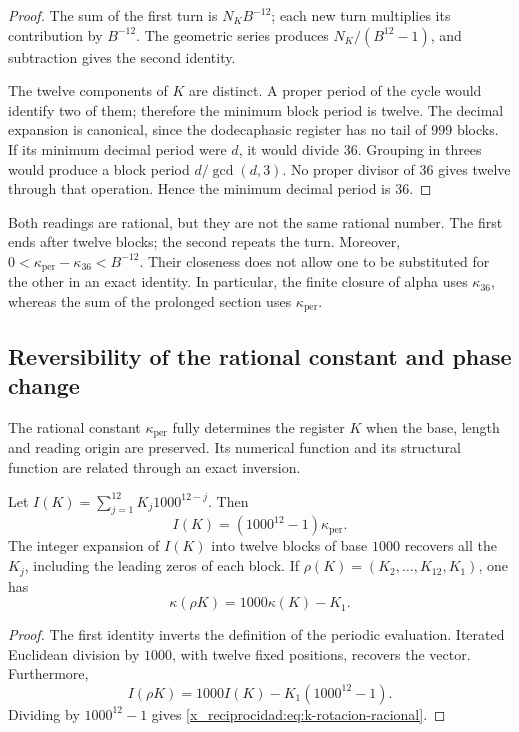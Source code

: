 \begin{proof}
The sum of the first turn is \(N_KB^{-12}\); each new turn
multiplies its contribution by \(B^{-12}\). The geometric series produces
\(N_K/(B^{12}-1)\), and subtraction gives the second identity.

The twelve components of \(K\) are distinct. A proper period of the cycle
would identify two of them; therefore the minimum block period is
twelve. The decimal expansion is canonical, since the dodecaphasic register has no tail
of 999 blocks. If its minimum decimal period were \(d\), it would divide
36. Grouping in threes would produce a block period
\(d/\gcd(d,3)\). No proper divisor of 36 gives twelve through that
operation. Hence the minimum decimal period is 36.
\end{proof}

Both readings are rational, but they are not the same rational number. The first
ends after twelve blocks; the second repeats the turn. Moreover,
\(0<\kappa_{\mathrm{per}}-\kappa_{36}<B^{-12}\). Their closeness does not
allow one to be substituted for the other in an exact identity. In particular,
the finite closure of alpha uses \(\kappa_{36}\), whereas the
sum of the prolonged section uses \(\kappa_{\mathrm{per}}\).


\subsection{Reversibility of the rational constant and phase change}

The rational constant \(\kappa_{\mathrm{per}}\) fully determines
the register \(K\) when the base, length and reading origin
are preserved. Its numerical function and its structural function are related
through an exact inversion.

\begin{proposition}
Let \(I(K)=\sum_{j=1}^{12}K_j1000^{12-j}\). Then
\[
 I(K)=(1000^{12}-1)\kappa_{\mathrm{per}}.
\]
The integer expansion of \(I(K)\) into twelve blocks of base \(1000\)
recovers all the \(K_j\), including the leading zeros of each block.
If \(\rho(K)=(K_2,\ldots,K_{12},K_1)\), one has
\begin{equation}
 \kappa(\rho K)=1000\kappa(K)-K_1.
 \label{x_reciprocidad:eq:k-rotacion-racional}
\end{equation}
\end{proposition}
\begin{proof}
The first identity inverts the definition of the periodic evaluation.
Iterated Euclidean division by \(1000\), with twelve fixed positions,
recovers the vector. Furthermore,
\[
 I(\rho K)=1000I(K)-K_1(1000^{12}-1).
\]
Dividing by \(1000^{12}-1\) gives \eqref{x_reciprocidad:eq:k-rotacion-racional}.
\end{proof}

